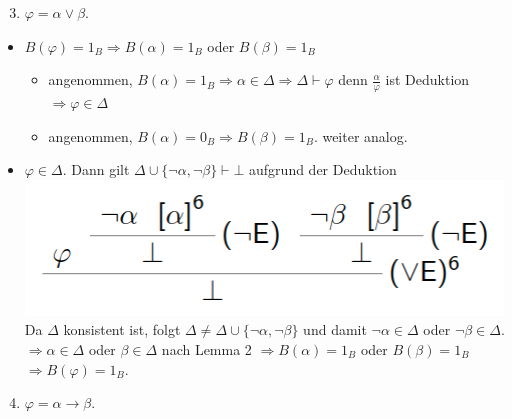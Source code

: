 \documentclass[a4paper]{article}
\begin{document}
\begin{multicols}{3}
  \begin{enumerate}
    \setcounter{enumi}{2}
    \itemsep1pt\parskip0pt
    \item
          $\varphi =\alpha\vee\beta$.
  \end{enumerate}

  \begin{itemize}
    \itemsep1pt\parskip0pt
    \item
          $B(\varphi) = 1_B \Rightarrow B(\alpha) = 1_B$ oder $B(\beta) = 1_B$

          \begin{itemize}
            \item
                  angenommen,
                  $B(\alpha) = 1_B \Rightarrow\alpha\in\Delta\Rightarrow\Delta\vdash\varphi$
                  denn $\frac{\alpha}{\varphi}$ ist Deduktion
                  $\Rightarrow\varphi\in\Delta$
            \item
                  angenommen, $B(\alpha) = 0_B \Rightarrow B(\beta) = 1_B$. weiter
                  analog.
          \end{itemize}
    \item
          $\varphi\in\Delta$. Dann gilt
          $\Delta\cup\{\lnot\alpha ,\lnot\beta\}\vdash \bot$ aufgrund der
          Deduktion \includegraphics[width=\linewidth]{Assets/Logik-beispiel-8.png} Da $\Delta$
          konsistent ist, folgt
          $\Delta\not=\Delta\cup\{\lnot\alpha,\lnot\beta\}$ und damit
          $\lnot\alpha\in\Delta$ oder $\lnot\beta\in\Delta$.
          $\Rightarrow\alpha\in\Delta$ oder $\beta\in\Delta$ nach Lemma 2
          $\Rightarrow B(\alpha) = 1_B$ oder $B(\beta) =1_B$
          $\Rightarrow B(\varphi) = 1_B$.
  \end{itemize}

  \begin{enumerate}
    \setcounter{enumi}{3}
    \itemsep1pt\parskip0pt
    \item
          $\varphi = \alpha\rightarrow\beta$.
  \end{enumerate}


\end{multicols}
\end{document}
